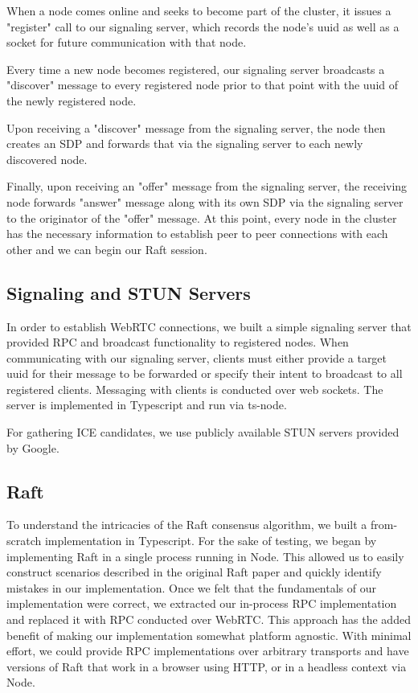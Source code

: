 \documentclass[11pt,twocolumn]{article}
\begin{document}
When a node comes online and seeks to become part of the cluster, it issues a "register" call to our signaling server, which records the node's uuid as well as a socket for future communication with that node.

Every time a new node becomes registered, our signaling server broadcasts a "discover" message to every registered node prior to that point with the uuid of the newly registered node.

Upon receiving a "discover" message from the signaling server, the node then creates an SDP and forwards that via the signaling server to each newly discovered node.

Finally, upon receiving an "offer" message from the signaling server, the receiving node forwards "answer" message along with its own SDP via the signaling server to the originator of the "offer" message. At this point, every node in the cluster has the necessary information to establish peer to peer connections with each other and we can begin our Raft session.


\subsection{Signaling and STUN Servers}
In order to establish WebRTC connections, we built a simple signaling server that provided RPC and broadcast functionality to registered nodes. When communicating with our signaling server, clients must either provide a target uuid for their message to be forwarded or specify their intent to broadcast to all registered clients. Messaging with clients is conducted over web sockets. The server is implemented in Typescript and run via ts-node.

For gathering ICE candidates, we use publicly available STUN servers provided by Google.

\subsection{Raft}
To understand the intricacies of the Raft consensus algorithm, we built a from-scratch implementation in Typescript. For the sake of testing, we began by implementing Raft in a single process running in Node. This allowed us to easily construct scenarios described in the original Raft paper and quickly identify mistakes in our implementation. Once we felt that the fundamentals of our implementation were correct, we extracted our in-process RPC implementation and replaced it with RPC conducted over WebRTC. This approach has the added benefit of making our implementation somewhat platform agnostic. With minimal effort, we could provide RPC implementations over arbitrary transports and have versions of Raft that work in a browser using HTTP, or in a headless context via Node.
\end{document}
